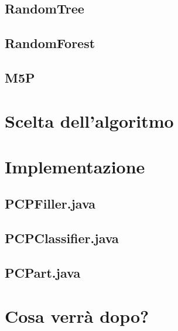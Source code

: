 \documentclass[12pt]{report}
\begin{document}
\subsection{RandomTree}
\subsection{RandomForest}
\subsection{M5P}

\section{Scelta dell'algoritmo}
\section{Implementazione}
\subsection{PCPFiller.java}
\subsection{PCPClassifier.java}
\subsection{PCPart.java}

\section{Cosa verrà dopo?}

%
\end{document}
